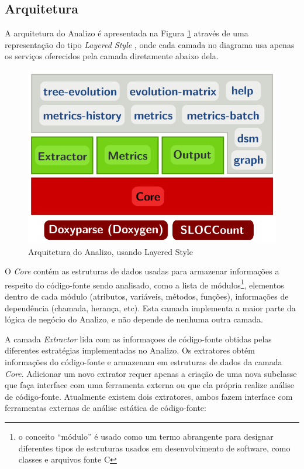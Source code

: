 \subsection{Arquitetura}

A arquitetura do Analizo é apresentada na Figura \ref{arquitetura-analizo}
através de uma representação do tipo {\it Layered Style} \cite{Clements2002},
onde cada camada no diagrama usa apenas os serviços oferecidos pela camada
diretamente abaixo dela.

\begin{figure}[h]
\center
\includegraphics[scale=0.3]{imagens/analizo-architecture.png}
\caption{Arquitetura do Analizo, usando Layered Style \cite{Clements2002}}
\label{arquitetura-analizo}
\end{figure}

O {\it Core} contém as estruturas de dados usadas para armazenar informações a
respeito do código-fonte sendo analisado, como a lista de módulos\footnote{o
conceito ``módulo'' é usado como um termo abrangente para designar diferentes
tipos de estruturas usados em desenvolvimento de software, como classes e
arquivos fonte C}, elementos dentro de cada módulo (atributos, variáveis,
métodos, funções), informações de dependência (chamada, herança, etc). Esta
camada implementa a maior parte da lógica de negócio do Analizo, e não depende
de nenhuma outra camada.

A camada {\it Extractor} lida com as informaçoes de código-fonte obtidas pelas
diferentes estratégias implementadas no Analizo. Os extratores obtém
informações do código-fonte e armazenam em estruturas de dados da camada {\it
Core}. Adicionar um novo extrator requer apenas a criação de uma nova subclasse
que faça interface com uma ferramenta externa ou que ela própria realize análise
de código-fonte. Atualmente existem dois extratores, ambos fazem interface
com ferramentas externas de análise estática de código-fonte:

